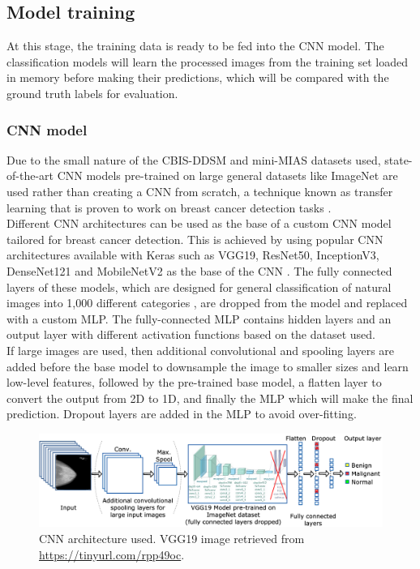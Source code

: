 


\subsection{Model training}

At this stage, the training data is ready to be fed into the CNN model. The classification models will learn the processed images from the training set loaded in memory before making their predictions, which will be compared with the ground truth labels for evaluation.

\subsubsection{CNN model}
\label{sec:design-cnn-model-decision}

Due to the small nature of the CBIS-DDSM and mini-MIAS datasets used, state-of-the-art CNN models pre-trained on large general datasets like ImageNet are used rather than creating a CNN from scratch, a technique known as transfer learning that is proven to work on breast cancer detection tasks \citep{Shen2017, Falconi2019}.\\

Different CNN architectures can be used as the base of a custom CNN model tailored for breast cancer detection. This is achieved by using popular CNN architectures available with Keras such as VGG19, ResNet50, InceptionV3, DenseNet121 and MobileNetV2 as the base of the CNN \citep{kerasApplications}. The fully connected layers of these models, which are designed for general classification of natural images into 1,000 different categories \citep{Krizhevsky2012}, are dropped from the model and replaced with a custom MLP. The fully-connected MLP contains hidden layers and an output layer with different activation functions based on the dataset used.\\

If large images are used, then additional convolutional and spooling layers are added before the base model to downsample the image to smaller sizes and learn low-level features, followed by the pre-trained base model, a flatten layer to convert the output from 2D to 1D, and finally the MLP which will make the final prediction. Dropout layers are added in the MLP to avoid over-fitting.

\begin{figure}[ht]
\centerline{\includegraphics[width=1.1\textwidth]{figures/design/CNN architecture.png}}
\caption{\label{fig:design-CNN architecture}CNN architecture used. VGG19 image retrieved from \url{https://tinyurl.com/rpp49oc}.}
\end{figure}

